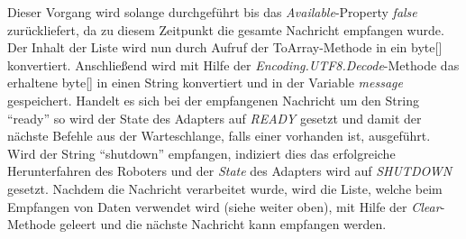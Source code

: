 \begin{itemize}
Dieser Vorgang wird solange durchgeführt bis das \textit{Available}-Property \textit{false} zurückliefert, da zu diesem Zeitpunkt die gesamte Nachricht empfangen wurde. Der Inhalt der Liste wird nun durch Aufruf der ToArray-Methode in ein byte[] konvertiert.
\newline
Anschließend wird mit Hilfe der \textit{Encoding.UTF8.Decode}-Methode das erhaltene byte[] in einen String konvertiert und in der Variable \textit{message} gespeichert. Handelt es sich bei der empfangenen Nachricht um den String “ready” so wird der State des Adapters auf \textit{READY} gesetzt und damit der nächste Befehle aus der Warteschlange, falls einer vorhanden ist, ausgeführt.
Wird der String “shutdown” empfangen, indiziert dies das erfolgreiche Herunterfahren des Roboters und der \textit{State} des Adapters wird auf \textit{SHUTDOWN} gesetzt. Nachdem die Nachricht verarbeitet wurde, wird die Liste, welche beim Empfangen von Daten verwendet wird (siehe weiter oben), mit Hilfe der \textit{Clear}-Methode geleert und die nächste Nachricht kann empfangen werden.
\end{itemize}